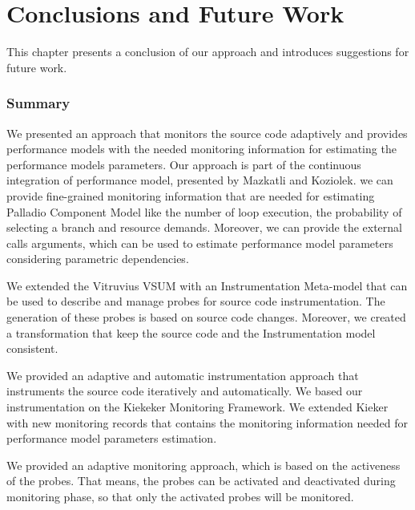 
\chapter{Conclusions and Future Work}
\label{ch:Conclusions and Future Work}

This chapter presents a conclusion of our approach and introduces suggestions for future work. 

\subsection{Summary}
\label{sec:summary}
We presented an approach that monitors the source code adaptively and provides performance models with the needed monitoring information for estimating the performance models parameters. Our approach is part of the continuous integration of performance model, presented by Mazkatli and Koziolek. we can provide fine-grained monitoring information that are needed for estimating Palladio Component Model like the number of loop execution, the probability of selecting a branch and resource demands. Moreover, we can provide the external calls arguments, which can be used to estimate performance model parameters considering parametric dependencies.

We extended the Vitruvius VSUM with an Instrumentation Meta-model that can be used to describe and manage probes for source code instrumentation. The generation of these probes is based on source code changes. Moreover, we created a transformation that keep the source code and the Instrumentation model consistent.

We provided an adaptive and automatic instrumentation approach that instruments the source code iteratively and automatically. We based our instrumentation on the Kiekeker Monitoring Framework. We extended Kieker with new monitoring records that contains the monitoring information needed for performance model parameters estimation.  

We provided an adaptive monitoring approach, which is based on the activeness of the probes. That means, the probes can be activated and deactivated during monitoring phase, so that only the activated probes will be monitored.

